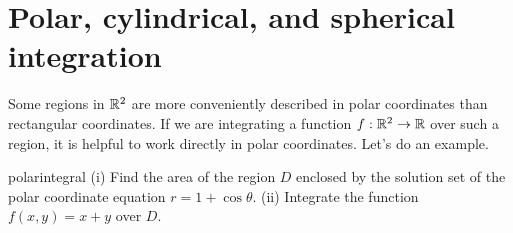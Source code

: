 \documentclass{watsonbook}
\begin{document}
\newpage 

\section{Polar, cylindrical, and spherical integration} \label{sec:polar_int}

Some regions in $\mathbb{R}^2$ are more conveniently described in polar
coordinates than rectangular coordinates. If we are integrating a
function $f: \mathbb{R}^2 \to \mathbb{R}$ over such a region, it is helpful to work
directly in polar coordinates. Let's do an example.

\begin{example}{}{polarintegral}
  (i) Find the area of the region $D$ enclosed by the solution set of
  the polar coordinate equation $r = 1 + \cos \theta$. (ii) Integrate
  the function $f(x,y) = x + y$ over $D$.
\end{example}
\end{document}
